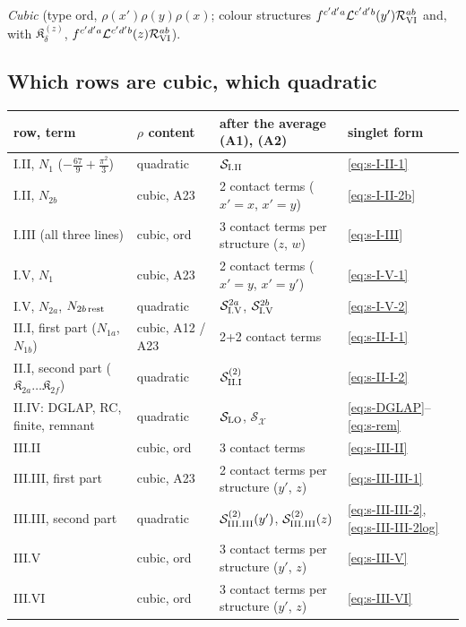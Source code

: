 \emph{Cubic} (type ord, $\rho(x')\rho(y)\rho(x)$; colour structures $f^{c'd'a}\mathcal{L}^{c'd'b}(y')\mathcal{R}^{ab}_{\rm VI}$ and, with $\mathfrak{K}_{\delta}^{(z)}$, $f^{c'd'a}\mathcal{L}^{c'd'b}(z)\mathcal{R}^{ab}_{\rm VI}$).

\subsection{Which rows are cubic, which quadratic}
\begin{center}
\renewcommand{\arraystretch}{1.3}
\small\begin{tabular}{|l|l|l|l|}
\hline
row, term & $\rho$ content & after the average (A1), (A2) & singlet form \\ \hline
I.II, $N_{1}$ ($-\frac{67}{9}+\frac{\pi^{2}}{3}$) & quadratic & $\mathcal{S}_{\rm I.II}$ & \eqref{eq:s-I-II-1} \\
I.II, $N_{2b}$ & cubic, A23 & 2 contact terms ($x'{=}x$, $x'{=}y$) & \eqref{eq:s-I-II-2b} \\
I.III (all three lines) & cubic, ord & 3 contact terms per structure ($z$, $w$) & \eqref{eq:s-I-III} \\
I.V, $N_{1}$ & cubic, A23 & 2 contact terms ($x'{=}y$, $x'{=}y'$) & \eqref{eq:s-I-V-1} \\
I.V, $N_{2a}$, $N_{2b\,\rm rest}$ & quadratic & $\mathcal{S}^{2a}_{\rm I.V}$, $\mathcal{S}^{2b}_{\rm I.V}$ & \eqref{eq:s-I-V-2} \\
II.I, first part ($N_{1a}$, $N_{1b}$) & cubic, A12 / A23 & 2+2 contact terms & \eqref{eq:s-II-I-1} \\
II.I, second part ($\mathfrak{K}_{2a}\dots\mathfrak{K}_{2f}$) & quadratic & $\mathcal{S}^{(2)}_{\rm II.I}$ & \eqref{eq:s-II-I-2} \\
II.IV: DGLAP, RC, finite, remnant & quadratic & $\mathcal{S}_{\rm LO}$, $\mathcal{S}_{\mathcal{X}}$ & \eqref{eq:s-DGLAP}--\eqref{eq:s-rem} \\
III.II & cubic, ord & 3 contact terms & \eqref{eq:s-III-II} \\
III.III, first part & cubic, A23 & 2 contact terms per structure ($y'$, $z$) & \eqref{eq:s-III-III-1} \\
III.III, second part & quadratic & $\mathcal{S}^{(2)}_{\rm III.III}(y')$, $\mathcal{S}^{(2)}_{\rm III.III}(z)$ & \eqref{eq:s-III-III-2}, \eqref{eq:s-III-III-2log} \\
III.V & cubic, ord & 3 contact terms per structure ($y'$, $z$) & \eqref{eq:s-III-V} \\
III.VI & cubic, ord & 3 contact terms per structure ($y'$, $z$) & \eqref{eq:s-III-VI} \\ \hline
\end{tabular}
\end{center}
